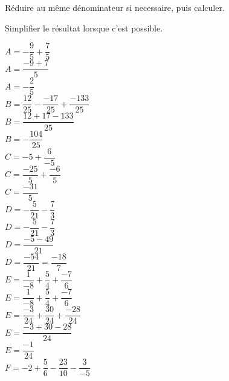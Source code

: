 \begin{corrige}
    Réduire au même dénominateur si necessaire, puis calculer.

    Simplifier le résultat lorsque c'est possible.
        \begin{itemize}
            \def\item{}
            \begin{spacing}{2}
                \item $A=-\dfrac{9}{5}+\dfrac{7}{5}$\\
                {\red $A=\dfrac{-9+7}{5}$\\
                $A=-\dfrac{2}{5}$\\
                }
                \item $B=\dfrac{12}{25}-\dfrac{-17}{25}+\dfrac{-133}{25}$\\
                {\red $B=\dfrac{12+17-133}{25}$\\
                $B=-\dfrac{104}{25}$\\
                }                
                \item $C=-5+\dfrac{6}{-5}$\\
                {\red $C=\dfrac{-25}{5}+\dfrac{-6}{5}$\\
                $C=\dfrac{-31}{5}$\\
                }
                \item $D=-\dfrac{5}{21}-\dfrac{7}{3}$\\
                {\red $D=-\dfrac{5}{21}-\dfrac{7}{3}$\\
                $D=\dfrac{-5-49}{21}$\\
                $D=\dfrac{-54}{21}=\dfrac{-18}{7}$\\
                }
                \item $E=\dfrac{1}{-8}+\dfrac{5}{4}+\dfrac{-7}{6}$\\
                {\red $E=\dfrac{1}{-8}+\dfrac{5}{4}+\dfrac{-7}{6}$\\
                $E=\dfrac{-3}{24}+\dfrac{30}{24}+\dfrac{-28}{24}$\\
                $E=\dfrac{-3+30-28}{24}$\\
                $E=\dfrac{-1}{24}$\\
                }
                \item $F=-2+\dfrac{5}{6}-\dfrac{23}{10}-\dfrac{3}{-5}$\\

\end{spacing}
\end{itemize}
\end{corrige}
